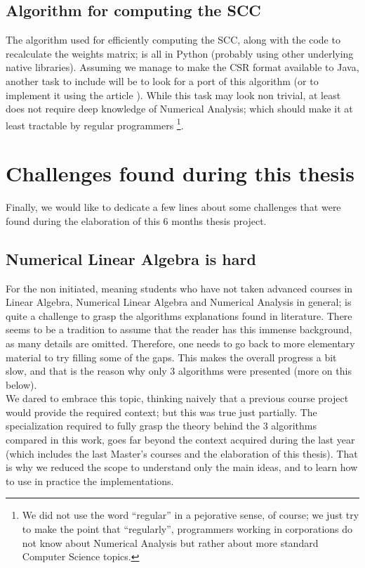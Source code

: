 \subsection{Algorithm for computing the \gls{SCC}}

The algorithm used for efficiently computing the \gls{SCC}, along with the
code to recalculate the weights matrix; is all in Python (probably
using other underlying native libraries). Assuming we manage to make the CSR
format available to Java, another task to include will be to look for
a port of this algorithm (or to implement it using the article
\cite{pearce05}). While this task may look non trivial, at least does
not require deep knowledge of Numerical Analysis; which should make it
at least tractable by regular programmers \footnote{We did not use the
word ``regular'' in a pejorative sense, of course; we just try to make
the point that ``regularly'', programmers working in corporations do
not know about Numerical Analysis but rather about more standard
Computer Science topics.}.

\section{Challenges found during this thesis}

Finally, we would like to dedicate a few lines about some challenges
that were found during the elaboration of this 6 months thesis
project.

\subsection{Numerical Linear Algebra is hard}

For the non initiated, meaning students who have not taken advanced
courses in Linear Algebra,  Numerical Linear Algebra and Numerical
Analysis in general; is quite a challenge to grasp the algorithms
explanations found in literature. There seems to be a tradition to
assume that the reader has this immense background, as many details
are omitted. Therefore, one needs to go back to more elementary
material to try filling some of the gaps. This makes the overall
progress a bit slow, and that is the reason why only 3 algorithms were
presented (more on this below). \\

We dared to embrace this topic, thinking naively that a previous
course project would provide the required context; but this was
true just partially. The specialization required to fully grasp the
theory behind the 3 algorithms compared in this work, goes far beyond
the context acquired during the last year (which includes the last
Master's courses and the elaboration of this thesis). That is why we
reduced the scope to understand only the main ideas, and to learn how
to use in practice the implementations.


